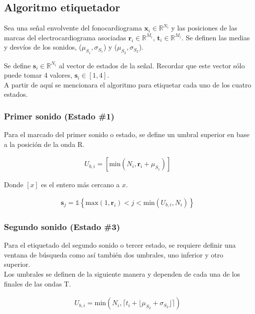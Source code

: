 \subsection*{Algoritmo etiquetador}

\indent Sea una señal envolvente del fonocardiograma $\bm{x}_i \in \mathbb{R}^{N_i}$ y las posiciones de las marcas
del electrocardiograma asociadas $\bm{r}_i \in \mathbb{R}^{M_i}$, $\mathbf{t}_i \in \mathbb{R}^{M_i}$. Se definen
las medias y desvíos de los sonidos, ($\mu_{S_1}, \sigma_{S_1}$) y ($\mu_{S_2}, \sigma_{S_2}$). \bigskip

\indent Se define $\mathbf{s}_i \in \mathbb{R}^{N_i}$ al vector de estados de la señal. Recordar que este vector
sólo puede tomar 4 valores, $\mathbf{s}_i \in [1,4]$. \\
\indent A partir de aquí se mencionara el algoritmo para etiquetar cada uno de los cuatro estados.

\subsubsection*{Primer sonido (Estado \#1)}

\indent Para el marcado del primer sonido o estado, se define un umbral superior en base a la posición de la onda R.

\begin{align}
  U_{b,i} = \left[\mathrm{min}(N_i,\mathbf{r}_i+\mu_{S_1})\right]
\end{align}

\indent Donde $[x]$ es el entero más cercano a $x$.

\begin{align}
  \bm{s}_j = \mathds{1}\left\{\mathrm{max}(1, \mathbf{r}_i) < j < \mathrm{min}(U_{b,i}, N_i)\right\}
\end{align}

\subsubsection*{Segundo sonido (Estado \#3)}

\indent Para el etiquetado del segundo sonido o tercer estado, se requiere definir una ventana de búsqueda como así
también dos umbrales, uno inferior y otro superior. \\
\indent Los umbrales se definen de la siguiente manera y dependen de cada una de los finales de las ondas T.

\begin{align}
  U_{b,i} = \mathrm{min}(N_i,\lceil t_i+\lfloor \mu_{S_2} + \sigma_{S_2} \rfloor \rceil)
\end{align}

